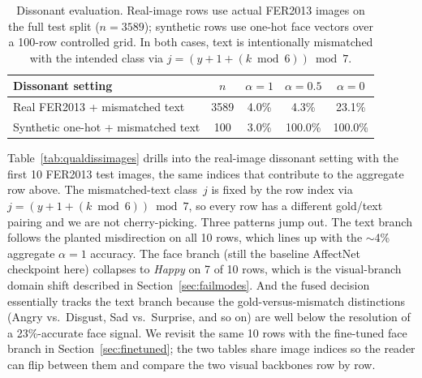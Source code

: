 \documentclass[sigconf,nonacm]{acmart}
\begin{document}
\begin{table}[t]
  \centering
  \small
  \caption{Dissonant evaluation. Real-image rows use actual FER2013 images on the full test split ($n\!=\!3589$); synthetic rows use one-hot face vectors over a 100-row controlled grid. In both cases, text is intentionally mismatched with the intended class via $j\!=\!(y\!+\!1\!+\!(k\bmod 6))\bmod 7$.}
  \label{tab:dissonance}
  \setlength{\tabcolsep}{3pt}
  \begin{tabular}{@{}p{3.4cm}cccc@{}}
    \toprule
    \textbf{Dissonant setting} & \textbf{$n$} & \textbf{$\alpha\!=\!1$} & \textbf{$\alpha\!=\!0.5$} & \textbf{$\alpha\!=\!0$} \\
    \midrule
    Real FER2013 + mismatched text   & 3589 & 4.0\%  & 4.3\%   & 23.1\% \\
    Synthetic one-hot + mismatched text & 100  & 3.0\%  & 100.0\% & 100.0\% \\
    \bottomrule
  \end{tabular}
\end{table}

Table~\ref{tab:qualdissimages} drills into the real-image dissonant setting with the first 10 FER2013 test images, the same indices that contribute to the aggregate row above. The mismatched-text class~$j$ is fixed by the row index via $j = (y + 1 + (k\bmod 6)) \bmod 7$, so every row has a different gold/text pairing and we are not cherry-picking. Three patterns jump out. The text branch follows the planted misdirection on all 10 rows, which lines up with the $\sim$4\% aggregate $\alpha\!=\!1$ accuracy. The face branch (still the baseline AffectNet checkpoint here) collapses to \emph{Happy} on 7 of 10 rows, which is the visual-branch domain shift described in Section~\ref{sec:failmodes}. And the fused decision essentially tracks the text branch because the gold-versus-mismatch distinctions (Angry vs.\ Disgust, Sad vs.\ Surprise, and so on) are well below the resolution of a 23\%-accurate face signal. We revisit the same 10 rows with the fine-tuned face branch in Section~\ref{sec:finetuned}; the two tables share image indices so the reader can flip between them and compare the two visual backbones row by row.
\end{document}
